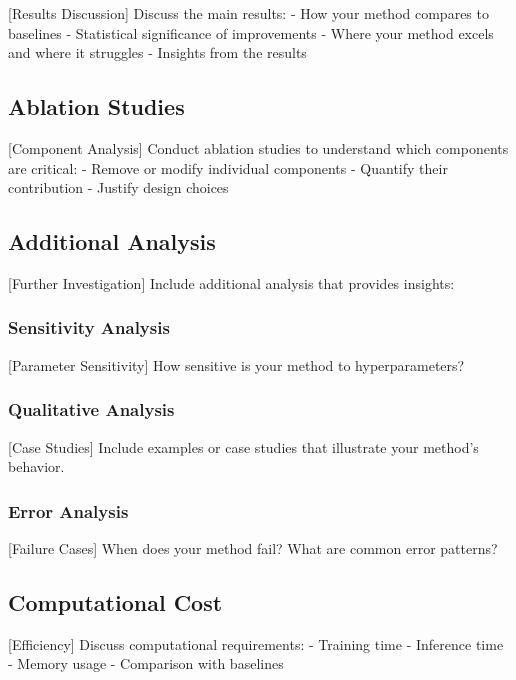 [Results Discussion] Discuss the main results:
- How your method compares to baselines
- Statistical significance of improvements
- Where your method excels and where it struggles
- Insights from the results

\subsection{Ablation Studies}
\label{sec:ablations}

[Component Analysis] Conduct ablation studies to understand which components are critical:
- Remove or modify individual components
- Quantify their contribution
- Justify design choices


\subsection{Additional Analysis}
\label{sec:analysis}

[Further Investigation] Include additional analysis that provides insights:

\subsubsection{Sensitivity Analysis}
[Parameter Sensitivity] How sensitive is your method to hyperparameters?

\subsubsection{Qualitative Analysis}
[Case Studies] Include examples or case studies that illustrate your method's behavior.


\subsubsection{Error Analysis}
[Failure Cases] When does your method fail? What are common error patterns?

\subsection{Computational Cost}
\label{sec:cost}

[Efficiency] Discuss computational requirements:
- Training time
- Inference time
- Memory usage
- Comparison with baselines
